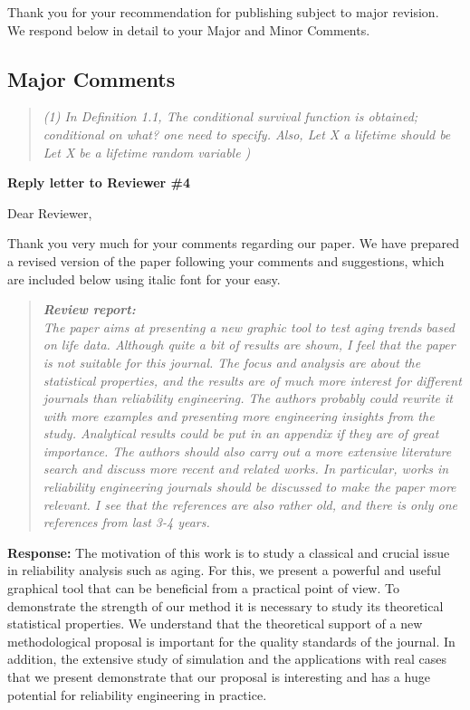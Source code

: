\documentclass[12pt]{article}
\begin{document}
\noindent Thank you for your recommendation for publishing  subject to major revision. \\
\noindent We respond below in detail to your Major and Minor Comments.

\subsection*{Major Comments}

\begin{quote}
	\emph{(1) In Definition 1.1, The conditional survival function is obtained; conditional on what? one need to specify. Also, Let X a lifetime should
		be Let X be a lifetime random variable )
	}
\end{quote}


\newpage
{\centerline {\bf \large Reply letter to Reviewer \#4}}
\vskip 1cm
\noindent Dear Reviewer, \vskip 0.5cm

\noindent Thank you very much for your comments regarding our paper. We have prepared a revised version of the paper following your comments and suggestions, which are included below using italic font for your easy.

\begin{quote}
	\emph{ {\bf Review report:} \\
		The paper aims at presenting a new graphic tool to test aging trends based on life data. Although quite a bit of results are shown, I feel that the paper is not suitable for this journal. The focus and analysis are about the statistical properties, and the results are of much more interest for different journals than reliability engineering. The authors probably could rewrite it with more examples and presenting more engineering insights from the study.  Analytical results could be put in an appendix if they are of great importance. The authors should also carry out a more extensive literature search and discuss more recent and related works. 	In particular, works in reliability engineering journals should be discussed to make the paper more relevant. I see that the references are also rather old, and there is only one references from last 3-4 years.}
\end{quote}

{\bf Response:} 
The motivation of this work is to study a classical and crucial issue in reliability analysis such as aging.
For this, we present a powerful and useful graphical tool that can be beneficial from a practical point of view.
To demonstrate the strength of our method it is necessary to study its theoretical statistical properties. We understand that the theoretical support of a new methodological proposal is important for the quality standards of the journal. In addition, the extensive study
of simulation and the applications with real cases that we present demonstrate that our proposal is interesting and has a huge potential for reliability engineering in practice.
\end{document}
